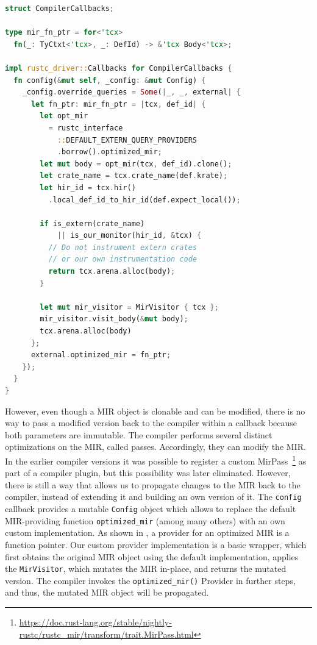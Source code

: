 \documentclass[paper=a4,%
  twoside,%
  BCOR4mm,%
  abstract=true,%
  toc=bibliography,%
  chapterprefix=true,%
  toc=bibliographynumbered,%
  open=right,%
  english,%
  pagesize=pdftex]{scrreprt}
\begin{document}
\begin{lstlisting}[language=Rust, style=boxed, caption={The Rust compiler interface accepts an object which implements its callback trait, allowing us to execute code at different compilation phases}, label=lst:compiler-callbacks]
struct CompilerCallbacks;

type mir_fn_ptr = for<'tcx>
  fn(_: TyCtxt<'tcx>, _: DefId) -> &'tcx Body<'tcx>;

impl rustc_driver::Callbacks for CompilerCallbacks {
  fn config(&mut self, _config: &mut Config) {
    _config.override_queries = Some(|_, _, external| {
      let fn_ptr: mir_fn_ptr = |tcx, def_id| {
        let opt_mir
          = rustc_interface
            ::DEFAULT_EXTERN_QUERY_PROVIDERS
            .borrow().optimized_mir;
        let mut body = opt_mir(tcx, def_id).clone();
        let crate_name = tcx.crate_name(def.krate);
        let hir_id = tcx.hir()
          .local_def_id_to_hir_id(def.expect_local());

        if is_extern(crate_name)
            || is_our_monitor(hir_id, &tcx) {
          // Do not instrument extern crates
          // or our own instrumentation code
          return tcx.arena.alloc(body);
        }

        let mut mir_visitor = MirVisitor { tcx };
        mir_visitor.visit_body(&mut body);
        tcx.arena.alloc(body)
      };
      external.optimized_mir = fn_ptr;
    });
  }
}
\end{lstlisting}
However, even though a \ac{MIR} object is clonable and can be modified, there is no way to pass a modified version back to the compiler within a callback because both parameters are immutable. The compiler performs several distinct optimizations on the MIR, called passes. Accordingly, they can modify the MIR. In the earlier compiler versions it was possible to register a custom MirPass~\footnote{\url{https://doc.rust-lang.org/stable/nightly-rustc/rustc_mir/transform/trait.MirPass.html}} as part of a compiler plugin, but this possibility was later eliminated. However, there is still a way that allows us to propagate changes to the MIR back to the compiler, instead of extending it and building an own version of it. The \lstinline{config} callback provides a mutable \lstinline{Config} object which allows to replace the default \ac{MIR}-providing function \lstinline{optimized_mir} (among many others) with an own custom implementation. As shown in , a provider for an optimized \ac{MIR} is a function pointer. Our custom provider implementation is a basic wrapper, which first obtains the original \ac{MIR} object using the default implementation, applies the \lstinline{MirVisitor}, which mutates the MIR in-place, and returns the mutated version. The compiler invokes the \lstinline{optimized_mir()} Provider in further steps, and thus, the mutated \ac{MIR} object will be propagated.
\end{document}
